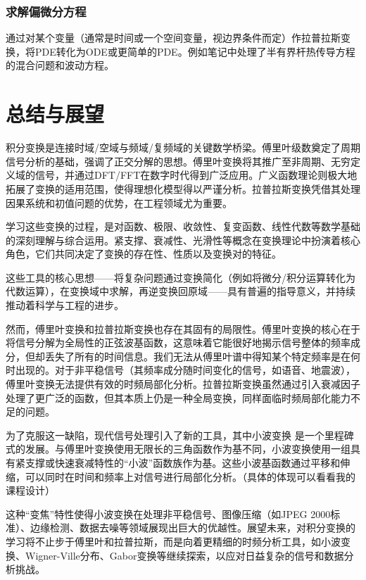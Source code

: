 \documentclass[UTF8]{ctexart}
\begin{document}
	\subsubsection{求解偏微分方程}
	通过对某个变量（通常是时间或一个空间变量，视边界条件而定）作拉普拉斯变换，将PDE转化为ODE或更简单的PDE。例如笔记中处理了半有界杆热传导方程的混合问题和波动方程。
	
\section{总结与展望}
积分变换是连接时域/空域与频域/复频域的关键数学桥梁。傅里叶级数奠定了周期信号分析的基础，强调了正交分解的思想。傅里叶变换将其推广至非周期、无穷定义域的信号，并通过DFT/FFT在数字时代得到广泛应用。广义函数理论则极大地拓展了变换的适用范围，使得理想化模型得以严谨分析。拉普拉斯变换凭借其处理因果系统和初值问题的优势，在工程领域尤为重要。

学习这些变换的过程，是对函数、极限、收敛性、复变函数、线性代数等数学基础的深刻理解与综合运用。紧支撑、衰减性、光滑性等概念在变换理论中扮演着核心角色，它们共同决定了变换的存在性、性质以及变换对的特征。

这些工具的核心思想——将复杂问题通过变换简化（例如将微分/积分运算转化为代数运算），在变换域中求解，再逆变换回原域——具有普遍的指导意义，并持续推动着科学与工程的进步。

然而，傅里叶变换和拉普拉斯变换也存在其固有的局限性。傅里叶变换的核心在于将信号分解为全局性的正弦波基函数，这意味着它能很好地揭示信号整体的频率成分，但却丢失了所有的时间信息。我们无法从傅里叶谱中得知某个特定频率是在何时出现的。对于非平稳信号（其频率成分随时间变化的信号，如语音、地震波），傅里叶变换无法提供有效的时频局部化分析。拉普拉斯变换虽然通过引入衰减因子处理了更广泛的函数，但其本质上仍是一种全局变换，同样面临时频局部化能力不足的问题。

为了克服这一缺陷，现代信号处理引入了新的工具，其中小波变换  是一个里程碑式的发展。与傅里叶变换使用无限长的三角函数作为基不同，小波变换使用一组具有紧支撑或快速衰减特性的“小波”函数族作为基。这些小波基函数通过平移和伸缩，可以同时在时间和频率上对信号进行局部化分析。（具体的体现可以看看我的课程设计）

这种“变焦”特性使得小波变换在处理非平稳信号、图像压缩（如JPEG 2000标准）、边缘检测、数据去噪等领域展现出巨大的优越性。展望未来，对积分变换的学习将不止步于傅里叶和拉普拉斯，而是向着更精细的时频分析工具，如小波变换、Wigner-Ville分布、Gabor变换等继续探索，以应对日益复杂的信号和数据分析挑战。
	
\end{document}
